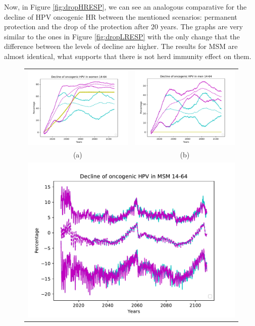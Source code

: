 Now, in Figure \ref{fig:dropHRESP}, we can see an analogous comparative for the decline of HPV oncogenic HR between the mentioned scenarios: permanent protection and the drop of the protection after $20$ years. The graphs are very similar to the ones in Figure \ref{fig:dropLRESP} with the only change that the difference between the levels of decline are higher. The results for MSM are almost identical, what supports that there is not herd immunity effect on them.

\begin{figure}[!]
	\centering
	\begin{tabular}{cc}
		\includegraphics[width=0.5\linewidth]{IMGs/6.-Caida_brusca/onco_muj.pdf}	& 
		\includegraphics[width=0.5\linewidth]{IMGs/6.-Caida_brusca/onco_hom.pdf}  \\ 
		(a)	& (b) \\ 
		\multicolumn{2}{c}{ \includegraphics[width=0.6\linewidth]{IMGs/6.-Caida_brusca/onco_MSM.pdf} } \\ 

\end{tabular}
\end{figure}
